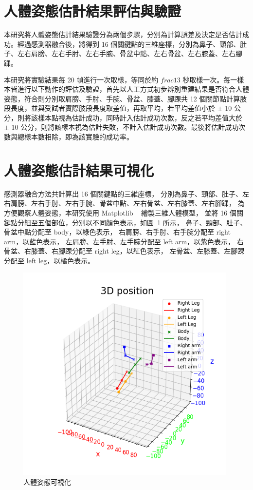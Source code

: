 \section{人體姿態估計結果評估與驗證}
本研究將人體姿態估計結果驗證分為兩個步驟，分別為計算誤差及決定是否估計成功。經過感測器融合後，將得到 16 個關鍵點的三維座標，分別為鼻子、頸部、肚子、左右肩膀、左右手肘、左右手腕、骨盆中點、左右骨盆、左右膝蓋、左右腳踝。

本研究將實驗結果每 20 幀進行一次取樣，等同於約 $frac{1}{3}$ 秒取樣一次。每一樣本皆進行以下動作的評估及驗證，首先以人工方式初步辨別重建結果是否符合人體姿態，符合則分別取肩膀、手肘、手腕、骨盆、膝蓋、腳踝共 12 個關節點計算肢段長度，並與受試者實際肢段長度取差值，再取平均，若平均差值小於 $\pm$ 10 公分，則將該樣本點視為估計成功，同時計入估計成功次數，反之若平均差值大於 $\pm$ 10 公分，則將該樣本視為估計失敗，不計入估計成功次數。最後將估計成功次數與總樣本數相除，即為該實驗的成功率。

\section{人體姿態估計結果可視化}
感測器融合方法共計算出 16 個關鍵點的三維座標，
分別為鼻子、頸部、肚子、左右肩膀、左右手肘、左右手腕、骨盆中點、左右骨盆、左右膝蓋、左右腳踝，
為方便觀察人體姿態，本研究使用 Matplotlib ~\cite{Hunter:2007} 繪製三維人體模型，
並將 16 個關鍵點分組至五個部位，分別以不同顏色表示，如圖~\ref{ch3_fig_posevis} 所示，
鼻子、頸部、肚子、骨盆中點分配至 body，以綠色表示，
右肩膀、右手肘、右手腕分配至 right arm，以藍色表示，
左肩膀、左手肘、左手腕分配至 left arm，以紫色表示，
右骨盆、右膝蓋、右腳踝分配至 right leg，以紅色表示，
左骨盆、左膝蓋、左腳踝分配至 left leg，以橘色表示。

\begin{figure}[!ht]
   \centering
   \includegraphics[width=11cm]{figure/ch3_fig_posevis.png}
    \caption[人體姿態可視化]{人體姿態可視化}
    \label{ch3_fig_posevis}
\end{figure}

